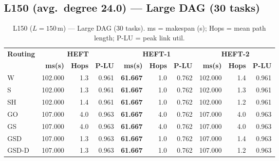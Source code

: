 \documentclass[11pt]{article}
\newcommand{\win}[1]{\textcolor{green!50!black}{\textbf{#1}}}
\newcommand{\bad}[1]{\textcolor{red!70!black}{#1}}
\begin{document}
\subsection{L150 (avg.\ degree 24.0) --- Large DAG (30 tasks)}
\begin{table}[H]
\centering\small
\begin{tabular}{l r r r r r r r r r}
\toprule
\textbf{Routing} & \multicolumn{3}{c}{\textbf{HEFT}} & \multicolumn{3}{c}{\textbf{HEFT-1}} & \multicolumn{3}{c}{\textbf{HEFT-2}} \\
\cmidrule(lr){2-4}\cmidrule(lr){5-7}\cmidrule(lr){8-10}
& \textbf{ms(s)} & \textbf{Hops} & \textbf{P-LU} & \textbf{ms(s)} & \textbf{Hops} & \textbf{P-LU} & \textbf{ms(s)} & \textbf{Hops} & \textbf{P-LU} \\
\midrule
  W & 102.000 & 1.3 & 0.961 & \win{61.667} & 1.0 & 0.762 & 102.000 & 1.4 & 0.961 \\
  S & 102.000 & 1.3 & 0.961 & \win{61.667} & 1.0 & 0.762 & 102.000 & 1.3 & 0.961 \\
  SH & 102.000 & 1.4 & 0.961 & \win{61.667} & 1.0 & 0.762 & 102.000 & 1.2 & 0.961 \\
  GO & \bad{107.000} & 4.0 & 0.963 & \win{61.667} & 4.0 & 0.762 & \bad{107.000} & 4.0 & 0.963 \\
  GS & \bad{107.000} & 4.0 & 0.963 & \win{61.667} & 4.0 & 0.762 & \bad{107.000} & 4.0 & 0.963 \\
  GSD & \bad{107.000} & 1.3 & 0.963 & \win{61.667} & 1.0 & 0.762 & \bad{107.000} & 1.4 & 0.963 \\
  GSD-D & \bad{107.000} & 1.3 & 0.963 & \win{61.667} & 1.0 & 0.762 & \bad{107.000} & 1.2 & 0.963 \\
\bottomrule
\end{tabular}
\caption{L150 ($L=150$\,m) --- Large DAG (30 tasks). ms = makespan (s); Hops = mean path length; P-LU = peak link util.}
\end{table}
\end{document}
